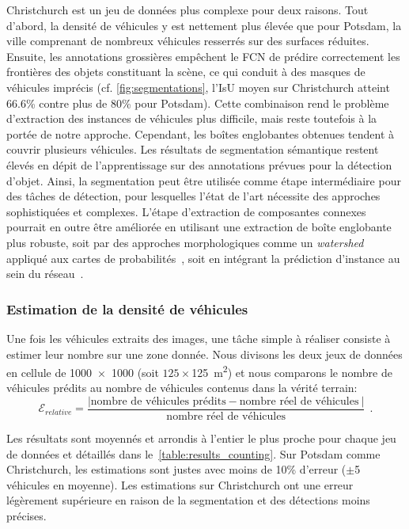 Christchurch est un jeu de données plus complexe pour deux raisons. Tout d'abord, la densité de véhicules y est nettement plus élevée que pour Potsdam, la ville comprenant de nombreux véhicules resserrés sur des surfaces réduites. Ensuite, les annotations grossières empêchent le \gls{FCN} de prédire correctement les frontières des objets constituant la scène, ce qui conduit à des masques de véhicules imprécis (cf. \cref{fig:segmentations}, l'\gls{IsU} moyen sur Christchurch atteint \num{66.6}\% contre plus de 80\% pour Potsdam). Cette combinaison rend le problème d'extraction des instances de véhicules plus difficile, mais reste toutefois à la portée de notre approche. Cependant, les boîtes englobantes obtenues tendent à couvrir plusieurs véhicules.
Les résultats de segmentation sémantique restent élevés en dépit de l'apprentissage sur des annotations prévues pour la détection d'objet. Ainsi, la segmentation peut être utilisée comme étape intermédiaire pour des tâches de détection, pour lesquelles l'état de l'art nécessite des approches sophistiquées et complexes. L'étape d'extraction de composantes connexes pourrait en outre être améliorée en utilisant une extraction de boîte englobante plus robuste, soit par des approches morphologiques comme un \emph{watershed} appliqué aux cartes de probabilités~\cite{beucher_morphological_1993,bai_deep_2017}, soit en intégrant la prédiction d'instance au sein du réseau~\cite{dai_instance-aware_2016,he_mask_2017}.

\subsubsection{Estimation de la densité de véhicules}

Une fois les véhicules extraits des images, une tâche simple à réaliser consiste à estimer leur nombre sur une zone donnée. Nous divisons les deux jeux de données en cellule de \num{1000x1000}\SI{}{\px} (soit $125\times$\SI{125}{\meter\squared}) et nous comparons le nombre de véhicules prédits au nombre de véhicules contenus dans la vérité terrain:
\begin{equation}
\mathcal{E}_\mathit{relative} = \frac{|\text{nombre de véhicules prédits} - \text{nombre réel de véhicules}~|}{\text{nombre réel de véhicules}}~~.
\end{equation}

Les résultats sont moyennés et arrondis à l'entier le plus proche pour chaque jeu de données et détaillés dans le~\cref{table:results_counting}. Sur Potsdam comme Christchurch, les estimations sont justes avec moins de 10\% d'erreur ($\pm$5 véhicules en moyenne). Les estimations sur Christchurch ont une erreur légèrement supérieure en raison de la segmentation et des détections moins précises.

